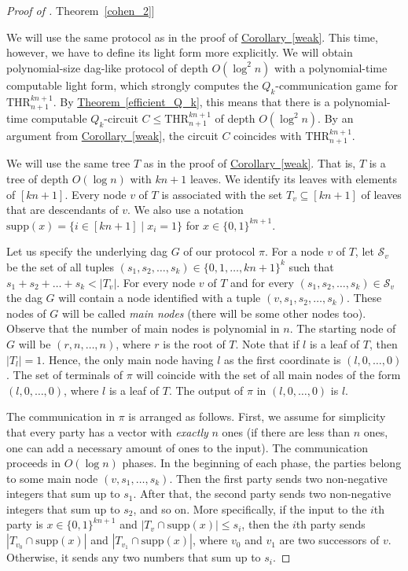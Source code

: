 \documentclass[11pt]{article}
\numberwithin{equation}{section}
\theoremstyle{definition}
\theoremstyle{plain}
\newcommand{\expref}[2]{\hyperref[#2]{#1~\ref{#2}}}
\def\THR{\mathrm{THR}}
\begin{document}
\begin{proof}[Proof of \expref{Theorem}{cohen_2}]

We will use the same protocol as in the proof of \expref{Corollary}{weak}. This time, however, we have to define its light form more explicitly.
We will obtain 
%
polynomial-size dag-like protocol 
of depth $O(\log^2 n)$  %
with a polynomial-time computable light form, which strongly computes the $Q_k$-communication game for $\THR^{kn + 1}_{n + 1}$. By \expref{Theorem}{efficient_Q_k}, this means that there is a polynomial-time computable 
%
%
%
$Q_k$-circuit $C\le \THR^{kn + 1}_{n + 1}$
of depth $O(\log^2 n)$.  %
By an argument from \expref{Corollary}{weak}, the circuit $C$ coincides with $\THR^{kn + 1}_{n + 1}$. 


We will use the same tree $T$ as in the proof of \expref{Corollary}{weak}. That is, $T$ is 
%
a tree of depth $O(\log n)$  %
with $kn + 1$ leaves. We identify its leaves with elements of $[kn + 1]$. Every node $v$ of $T$ is associated with the set $T_v\subseteq[kn + 1]$ of leaves that are descendants of $v$. We also use a notation $\mathrm{supp}(x) = \{i\in[kn+1]\mid x_i = 1\}$ for $x\in\{0, 1\}^{kn+1}$.

Let us specify the underlying dag $G$ of our protocol $\pi$.
 For a node $v$ of $T$, let $\mathcal{S}_v$ be the set of all tuples $(s_1, s_2, \ldots, s_k) \in \{0, 1, \ldots, kn + 1\}^k$ such that $s_1 + s_2 + \ldots + s_k < |T_v|$. For every node $v$ of $T$ and for every $(s_1, s_2, \ldots, s_k) \in \mathcal{S}_v$ the dag $G$ will contain a node identified with a tuple $(v, s_1, s_2, \ldots, s_k)$. These nodes of $G$ will be called \emph{main nodes} (there will be some other nodes too). Observe that the number of main nodes is polynomial in $n$. The starting node of $G$ will be $(r, n, \ldots, n)$, where $r$ is the root of $T$. Note that if $l$ is a leaf of $T$, then $|T_l| = 1$. Hence, the only main node having $l$ as the first coordinate is $(l, 0, \ldots, 0)$. The set of terminals of $\pi$ will coincide with the set of all main nodes of the form $(l, 0, \ldots, 0)$, where $l$ is a leaf of $T$. The output of $\pi$ in $(l, 0, \ldots, 0)$ is $l$. 

The communication in $\pi$ is arranged as follows. First, we assume for simplicity that every party has a vector with \emph{exactly} $n$ ones (if there are less than $n$ ones, one can add a necessary amount of ones to the input). The communication proceeds in $O(\log n)$ phases.
 In the beginning of each phase, the parties belong to some main node $(v, s_1, \ldots, s_k)$. Then the first party sends two non-negative integers that sum up to $s_1$. After that, the second party sends two non-negative integers that sum up to $s_2$, and so on. More specifically, if the input to the $i$th party is $x\in\{0, 1\}^{kn + 1}$ and $|T_v\cap\mathrm{supp}(x)| \le s_i$, then the $i$th party sends $|T_{v_0}\cap\mathrm{supp}(x)|$ and $|T_{v_1}\cap\mathrm{supp}(x)|$,  where $v_0$ and $v_1$ are two successors of $v$. Otherwise, it sends any two numbers that sum up to $s_i$.


\end{proof}
\end{document}
